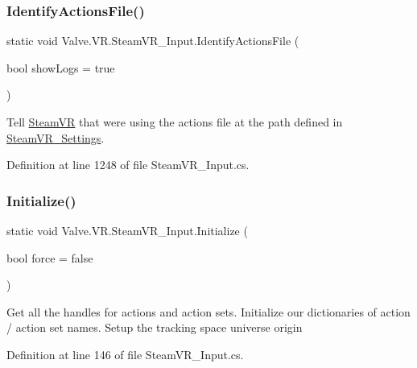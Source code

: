 \subsubsection{\texorpdfstring{IdentifyActionsFile()}{IdentifyActionsFile()}}
{\footnotesize\ttfamily static void Valve.\+V\+R.\+Steam\+V\+R\+\_\+\+Input.\+Identify\+Actions\+File (\begin{DoxyParamCaption}\item[{bool}]{show\+Logs = {\ttfamily true} }\end{DoxyParamCaption})\hspace{0.3cm}{\ttfamily [static]}}



Tell \mbox{\hyperlink{class_valve_1_1_v_r_1_1_steam_v_r}{Steam\+VR}} that we\textquotesingle{}re using the actions file at the path defined in \mbox{\hyperlink{class_valve_1_1_v_r_1_1_steam_v_r___settings}{Steam\+V\+R\+\_\+\+Settings}}. 



Definition at line 1248 of file Steam\+V\+R\+\_\+\+Input.\+cs.

\mbox{\label{class_valve_1_1_v_r_1_1_steam_v_r___input_ac9a4c04c5c0da11d4b52b2b9cca9b120}} 
\subsubsection{\texorpdfstring{Initialize()}{Initialize()}}
{\footnotesize\ttfamily static void Valve.\+V\+R.\+Steam\+V\+R\+\_\+\+Input.\+Initialize (\begin{DoxyParamCaption}\item[{bool}]{force = {\ttfamily false} }\end{DoxyParamCaption})\hspace{0.3cm}{\ttfamily [static]}}



Get all the handles for actions and action sets. Initialize our dictionaries of action / action set names. Setup the tracking space universe origin 



Definition at line 146 of file Steam\+V\+R\+\_\+\+Input.\+cs.

\mbox{\label{class_valve_1_1_v_r_1_1_steam_v_r___input_a45c0fb7aca33a1e2db7c4f5730ac8189}} 

